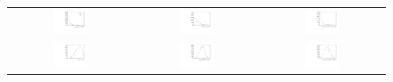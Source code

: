 \begin{figure}
\centering
\begin{tabular}{ccc}
\includegraphics[width=0.3\textwidth]{ANA_resources/Plots/Monte_carlo/data_vs_MC/Kpipipi/acos(Bd_DIRA_OWNPV)_2016.pdf} & \includegraphics[width=0.3\textwidth]{ANA_resources/Plots/Monte_carlo/data_vs_MC/Kpipipi/Bd_IPCHI2_OWNPV_2016.pdf} & \includegraphics[width=0.3\textwidth]{ANA_resources/Plots/Monte_carlo/data_vs_MC/Kpipipi/Bd_LOKI_VFASPF_VCHI2VDOF_2016.pdf} \\
\includegraphics[width=0.3\textwidth]{ANA_resources/Plots/Monte_carlo/data_vs_MC/Kpipipi/Bd_ptasy_1_50_2016.pdf} & \includegraphics[width=0.3\textwidth]{ANA_resources/Plots/Monte_carlo/data_vs_MC/Kpipipi/log10(D0_IPCHI2_OWNPV)_2016.pdf} & \includegraphics[width=0.3\textwidth]{ANA_resources/Plots/Monte_carlo/data_vs_MC/Kpipipi/log10(KstarK_IPCHI2_OWNPV)_2016.pdf} \\

\end{tabular}
\end{figure}
